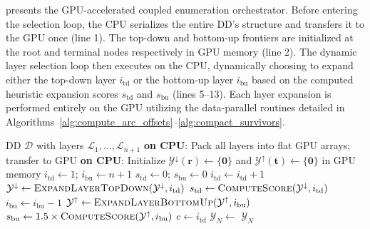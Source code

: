 \documentclass[letterpaper]{article}
\begin{document}
 presents the GPU-accelerated coupled enumeration orchestrator. Before entering the selection loop, the CPU serializes the entire DD's structure and transfers it to the GPU once (line 1). The top-down and bottom-up frontiers are initialized at the root and terminal nodes respectively in GPU memory (line 2). The dynamic layer selection loop then executes on the CPU, dynamically choosing to expand either the top-down layer $i_{\text{td}}$ or the bottom-up layer $i_{\text{bu}}$ based on the computed heuristic expansion scores $s_{\text{td}}$ and $s_{\text{bu}}$ (lines 5--13). Each layer expansion is performed entirely on the GPU utilizing the data-parallel routines detailed in Algorithms~\ref{alg:compute_arc_offsets}--\ref{alg:compact_survivors}.

\begin{algorithm}[tbp!]
\caption{GPU-Accelerated Coupled Pareto Frontier Enumeration}
\label{alg:gpu_coupled_pf}
\begin{algorithmic}[1]
\Require DD $\mathcal{D}$ with layers $\mathcal{L}_1,\dots,\mathcal{L}_{n+1}$
\State \textbf{on CPU}: Pack all layers into flat GPU arrays; transfer to GPU 
\State \textbf{on CPU}: Initialize $\mathcal{Y}^{\downarrow}(\mathbf{r}) \gets \{\mathbf{0}\}$ and $\mathcal{Y}^{\uparrow}(\mathbf{t}) \gets \{\mathbf{0}\}$ in GPU memory
\State $i_{\text{td}} \gets 1$; \quad $i_{\text{bu}} \gets n+1$
\State $s_{\text{td}} \gets 0$; \quad $s_{\text{bu}} \gets 0$
     
        \State $i_{\text{td}} \gets i_{\text{td}} + 1$
        \State $\mathcal{Y}^{\downarrow} \gets \textsc{ExpandLayerTopDown}(\mathcal{Y}^{\downarrow}, i_{\text{td}})$
        \State $s_{\text{td}} \gets \textsc{ComputeScore}(\mathcal{Y}^{\downarrow}, i_{\text{td}})$
    \Else {}
        \State $i_{\text{bu}} \gets i_{\text{bu}} - 1$
        \State $\mathcal{Y}^{\uparrow} \gets \textsc{ExpandLayerBottomUp}(\mathcal{Y}^{\uparrow}, i_{\text{bu}})$
        \State $s_{\text{bu}} \gets 1.5 \times \textsc{ComputeScore}(\mathcal{Y}^{\uparrow}, i_{\text{bu}})$
    \EndIf
\EndWhile
\State $c \gets i_{\text{td}}$ 
\State $\mathcal{Y}_N \gets$ 
\State \Return $\mathcal{Y}_N$
\end{algorithmic}
\end{algorithm}
\end{document}
